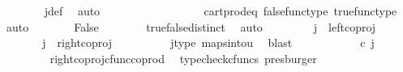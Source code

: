 \begin{isabellebody}
\ \ \ \ \ \ \isamarkupfalse%
\ j{\isacharunderscore}{\kern0pt}def\ \isamarkupfalse%
\ auto\isanewline
\ \ \ \ \isamarkupfalse%
\ \isamarkupfalse%
\ {\isachardoublequoteopen}{\isasymt}\ {\isacharequal}{\kern0pt}\ {\isasymf}{\isachardoublequoteclose}\isanewline
\ \ \ \ \ \ \isamarkupfalse%
\ cart{\isacharunderscore}{\kern0pt}prod{\isacharunderscore}{\kern0pt}eq{}\ false{\isacharunderscore}{\kern0pt}func{\isacharunderscore}{\kern0pt}type\ true{\isacharunderscore}{\kern0pt}func{\isacharunderscore}{\kern0pt}type\ \isamarkupfalse%
\ auto\isanewline
\ \ \ \ \isamarkupfalse%
\ \isamarkupfalse%
\ False\isanewline
\ \ \ \ \ \ \isamarkupfalse%
\ true{\isacharunderscore}{\kern0pt}false{\isacharunderscore}{\kern0pt}distinct\ \isamarkupfalse%
\ auto\isanewline
\ \ \isamarkupfalse%
\isanewline
\ \ \ \ \isamarkupfalse%
\ {\isachardoublequoteopen}j\ {\isasymnoteq}\ left{\isacharunderscore}{\kern0pt}coproj\ {\isasymone}\ {\isasymone}{\isachardoublequoteclose}\isanewline
\ \ \ \ \isamarkupfalse%
\ \isamarkupfalse%
\ {\isachardoublequoteopen}j\ {\isacharequal}{\kern0pt}\ right{\isacharunderscore}{\kern0pt}coproj\ {\isasymone}\ {\isasymone}{\isachardoublequoteclose}\isanewline
\ \ \ \ \ \ \isamarkupfalse%
\ j{\isacharunderscore}{\kern0pt}type\ maps{\isacharunderscore}{\kern0pt}into{\isacharunderscore}{\kern0pt}{}u{}\ \isamarkupfalse%
\ blast\isanewline
\ \ \ \ \isamarkupfalse%
\ \isamarkupfalse%
\ {\isachardoublequoteopen}{\isacharparenleft}{\kern0pt}{\isasymlangle}{\isasymt}{\isacharcomma}{\kern0pt}\ {\isasymt}{\isasymrangle}\ {\isasymamalg}{\isasymlangle}{\isasymf}{\isacharcomma}{\kern0pt}\ {\isasymf}{\isasymrangle}{\isacharparenright}{\kern0pt}\ {\isasymcirc}\isactrlsub c\ j\ \ {\isacharequal}{\kern0pt}\ {\isasymlangle}{\isasymf}{\isacharcomma}{\kern0pt}\ {\isasymf}{\isasymrangle}{\isachardoublequoteclose}\isanewline
\ \ \ \ \ \ \isamarkupfalse%
\ \ right{\isacharunderscore}{\kern0pt}coproj{\isacharunderscore}{\kern0pt}cfunc{\isacharunderscore}{\kern0pt}coprod\ \isamarkupfalse%
\ {\isacharparenleft}{\kern0pt}typecheck{\isacharunderscore}{\kern0pt}cfuncs{\isacharcomma}{\kern0pt}\ presburger{\isacharparenright}{\kern0pt}\isanewline
\ \ \ \ \isamarkupfalse%
\ \isamarkupfalse%

\end{isabellebody}
